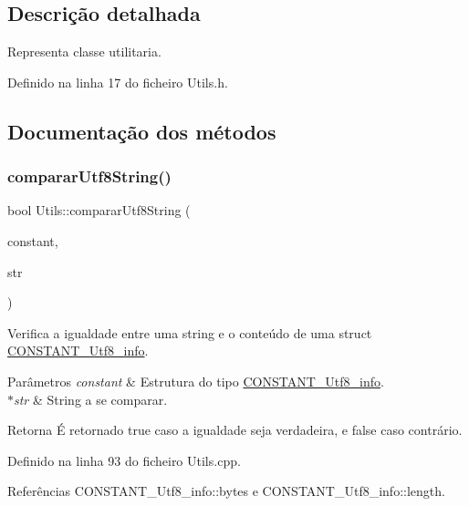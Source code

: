\subsection{Descrição detalhada}
Representa classe utilitaria. 

Definido na linha 17 do ficheiro Utils.\+h.



\subsection{Documentação dos métodos}
\mbox{\label{classUtils_a63daf33599b447a8f3b2ea5aef2815ce}} 
\subsubsection{\texorpdfstring{comparar\+Utf8\+String()}{compararUtf8String()}}
{\footnotesize\ttfamily bool Utils\+::comparar\+Utf8\+String (\begin{DoxyParamCaption}\item[{\hyperlink{structCONSTANT__Utf8__info}{C\+O\+N\+S\+T\+A\+N\+T\+\_\+\+Utf8\+\_\+info}}]{constant,  }\item[{const char $\ast$}]{str }\end{DoxyParamCaption})\hspace{0.3cm}{\ttfamily [static]}}

Verifica a igualdade entre uma string e o conteúdo de uma struct {\ttfamily \hyperlink{structCONSTANT__Utf8__info}{C\+O\+N\+S\+T\+A\+N\+T\+\_\+\+Utf8\+\_\+info}}. 
\begin{DoxyParams}{Parâmetros}
{\em constant} & Estrutura do tipo {\ttfamily \hyperlink{structCONSTANT__Utf8__info}{C\+O\+N\+S\+T\+A\+N\+T\+\_\+\+Utf8\+\_\+info}}. \\
\hline
{\em $\ast$str} & String a se comparar. \\
\hline
\end{DoxyParams}
\begin{DoxyReturn}{Retorna}
É retornado {\ttfamily true} caso a igualdade seja verdadeira, e {\ttfamily false} caso contrário. 
\end{DoxyReturn}


Definido na linha 93 do ficheiro Utils.\+cpp.



Referências C\+O\+N\+S\+T\+A\+N\+T\+\_\+\+Utf8\+\_\+info\+::bytes e C\+O\+N\+S\+T\+A\+N\+T\+\_\+\+Utf8\+\_\+info\+::length.




